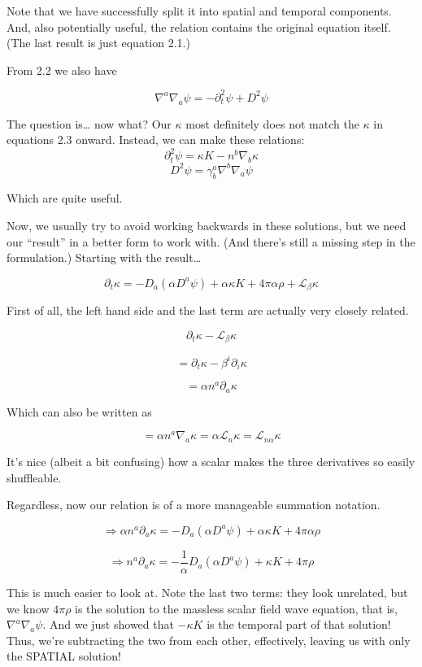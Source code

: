 \documentclass[landscape,letterpaper,10pt,english]{article}
\begin{document}
Note that we have successfully split it into spatial and temporal
components. And, also potentially useful, the relation contains the
original equation itself. (The last result is just equation 2.1.)

From 2.2 we also have

\[ \nabla^a \nabla_a \psi = -\partial_t^2 \psi + D^2 \psi \]

    The question is\ldots{} now what? Our \(\kappa\) most definitely does
not match the \(\kappa\) in equations 2.3 onward. Instead, we can make
these relations:
\[ \partial_t^2 \psi = \kappa K - n^b \nabla_b \kappa \]
\[ D^2 \psi = \gamma^a_b \nabla^b \nabla_a \psi \]

    Which are quite useful.

Now, we usually try to avoid working backwards in these solutions, but
we need our ``result'' in a better form to work with. (And there's still
a missing step in the formulation.) Starting with the result\ldots{}

\[ \partial_t \kappa = -D_a(\alpha D^a \psi) + \alpha \kappa K + 4\pi \alpha\rho + \mathcal{L}_\beta \kappa \]

First of all, the left hand side and the last term are actually very
closely related.

\[ \partial_t \kappa - \mathcal{L}_\beta \kappa \]

\[ = \partial_t \kappa - \beta^i \partial_i \kappa \]

\[ = \alpha n^a \partial_a \kappa \]

Which can also be written as

\[ = \alpha n^a \nabla_a \kappa = \alpha \mathcal{L}_n \kappa = \mathcal{L}_{n\alpha} \kappa\]

It's nice (albeit a bit confusing) how a scalar makes the three
derivatives so easily shuffleable.

    Regardless, now our relation is of a more manageable summation notation.

\[ \Rightarrow \alpha n^a \partial_a \kappa = -D_a(\alpha D^a \psi) + \alpha \kappa K + 4\pi \alpha\rho \]

\[ \Rightarrow n^a \partial_a \kappa = -\frac{1}{\alpha} D_a(\alpha D^a \psi) + \kappa K + 4 \pi \rho \]

This is much easier to look at. Note the last two terms: they look
unrelated, but we know \(4 \pi \rho\) is the solution to the massless
scalar field wave equation, that is, \(\nabla^a \nabla_a \psi\). And we
just showed that \(-\kappa K\) is the temporal part of that solution!
Thus, we're subtracting the two from each other, effectively, leaving us
with only the SPATIAL solution!
\end{document}

